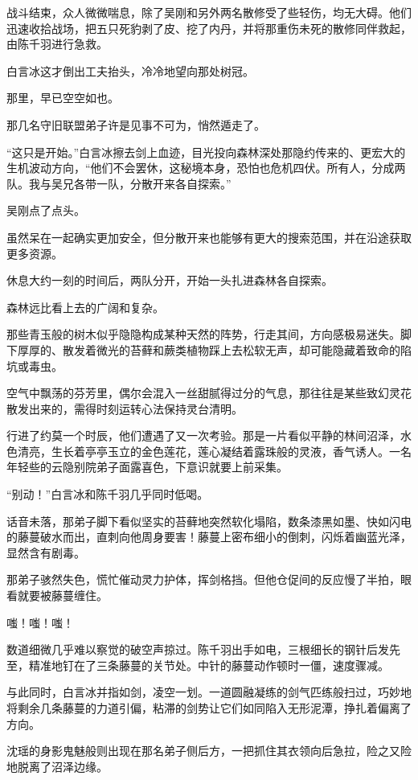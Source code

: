 战斗结束，众人微微喘息，除了吴刚和另外两名散修受了些轻伤，均无大碍。他们迅速收拾战场，把五只死豹剥了皮、挖了内丹，并将那重伤未死的散修同伴救起，由陈千羽进行急救。

白言冰这才倒出工夫抬头，冷冷地望向那处树冠。

那里，早已空空如也。

那几名守旧联盟弟子许是见事不可为，悄然遁走了。

“这只是开始。”白言冰擦去剑上血迹，目光投向森林深处那隐约传来的、更宏大的生机波动方向，“他们不会罢休，这秘境本身，恐怕也危机四伏。所有人，分成两队。我与吴兄各带一队，分散开来各自探索。”

吴刚点了点头。

虽然呆在一起确实更加安全，但分散开来也能够有更大的搜索范围，并在沿途获取更多资源。

休息大约一刻的时间后，两队分开，开始一头扎进森林各自探索。

\vspace{2em}

森林远比看上去的广阔和复杂。

那些青玉般的树木似乎隐隐构成某种天然的阵势，行走其间，方向感极易迷失。脚下厚厚的、散发着微光的苔藓和蕨类植物踩上去松软无声，却可能隐藏着致命的陷坑或毒虫。

空气中飘荡的芬芳里，偶尔会混入一丝甜腻得过分的气息，那往往是某些致幻灵花散发出来的，需得时刻运转心法保持灵台清明。

行进了约莫一个时辰，他们遭遇了又一次考验。那是一片看似平静的林间沼泽，水色清亮，生长着亭亭玉立的金色莲花，莲心凝结着露珠般的灵液，香气诱人。一名年轻些的云隐别院弟子面露喜色，下意识就要上前采集。

“别动！”白言冰和陈千羽几乎同时低喝。

话音未落，那弟子脚下看似坚实的苔藓地突然软化塌陷，数条漆黑如墨、快如闪电的藤蔓破水而出，直刺向他周身要害！藤蔓上密布细小的倒刺，闪烁着幽蓝光泽，显然含有剧毒。

那弟子骇然失色，慌忙催动灵力护体，挥剑格挡。但他仓促间的反应慢了半拍，眼看就要被藤蔓缠住。

嗤！嗤！嗤！

数道细微几乎难以察觉的破空声掠过。陈千羽出手如电，三根细长的钢针后发先至，精准地钉在了三条藤蔓的关节处。中针的藤蔓动作顿时一僵，速度骤减。

与此同时，白言冰并指如剑，凌空一划。一道圆融凝练的剑气匹练般扫过，巧妙地将剩余几条藤蔓的力道引偏，粘滞的剑势让它们如同陷入无形泥潭，挣扎着偏离了方向。

沈瑶的身影鬼魅般则出现在那名弟子侧后方，一把抓住其衣领向后急拉，险之又险地脱离了沼泽边缘。

